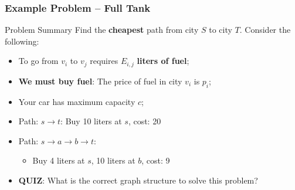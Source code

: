 \begin{frame}
  \frametitle{Example Problem -- Full Tank}
  \begin{block}{Problem Summary}
    Find the {\bf cheapest} path from city $S$ to city $T$. Consider the following:

    \begin{itemize}
      \item To go from $v_i$ to $v_j$ requires $E_{i,j}$ {\bf liters of fuel};
      \item {\bf We must buy fuel}: The price of fuel in city $v_i$ is $p_i$;
      \item Your car has maximum capacity $c$;
    \end{itemize}
  \end{block}

  \begin{center}
  \end{center}

  \begin{itemize}
    \item Path: $s\to t$: Buy 10 liters at $s$, cost: 20
    \item Path: $s\to a\to b\to t$:
    \begin{itemize}
      \item Buy 4 liters at $s$, 10 liters at $b$, cost: 9
    \end{itemize}
    \item {\bf QUIZ}: What is the correct graph structure to solve this problem?
  \end{itemize}
\end{frame}

